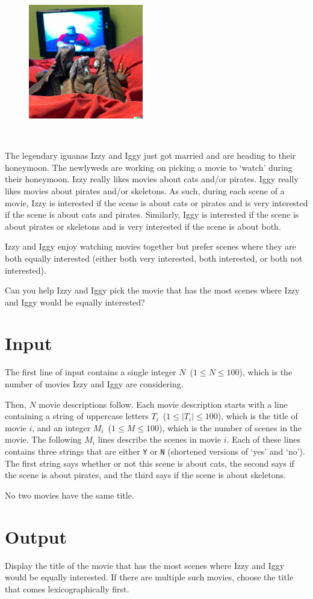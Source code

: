 
\begin{figure}
 \includegraphics[width=50mm]{img.png}
\end{figure}
~

The legendary iguanas Izzy and Iggy just got married and are heading to their honeymoon. The newlyweds are working on picking a movie to `watch' during their honeymoon. Izzy really likes movies about cats and/or pirates. Iggy really likes movies about pirates and/or skeletons. As such, during each scene of a movie, Izzy is interested if the scene is about cats or pirates and is very interested if the scene is about cats and pirates. Similarly, Iggy is interested if the scene is about pirates or skeletons and is very interested if the scene is about both.

Izzy and Iggy enjoy watching movies together but prefer scenes where they are both equally interested (either both very interested, both interested, or both not interested).

Can you help Izzy and Iggy pick the movie that has the most scenes where Izzy and Iggy would be equally interested?


\section*{Input}

The first line of input contains a single integer $N$~($1 \leq N \leq 100$), which is the number of movies Izzy and Iggy are considering.

Then, $N$ movie descriptions follow. Each movie description starts with a line containing a string of uppercase letters $T_i$~($1 \leq |T_i| \leq 100$), which is the title of movie $i$, and an integer $M_i$~($1 \leq M \leq 100$), which is the number of scenes in the movie. The following $M_i$ lines describe the scenes in movie $i$. Each of these lines contains three strings that are either \texttt{Y} or \texttt{N} (shortened versions of `yes' and `no'). The first string says whether or not this scene is about cats, the second says if the scene is about pirates, and the third says if the scene is about skeletons.

No two movies have the same title.


\section*{Output}

Display the title of the movie that has the most scenes where Izzy and Iggy would be equally interested. If there are multiple such movies, choose the title that comes lexicographically first.

